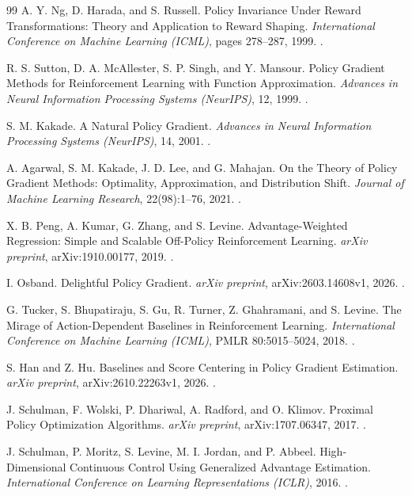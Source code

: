 \begin{thebibliography}{99}
A. Y. Ng, D. Harada, and S. Russell.
\newblock Policy Invariance Under Reward Transformations: Theory and Application to Reward Shaping.
\newblock \emph{International Conference on Machine Learning (ICML)}, pages 278--287, 1999.
\newblock {}.

R. S. Sutton, D. A. McAllester, S. P. Singh, and Y. Mansour.
\newblock Policy Gradient Methods for Reinforcement Learning with Function Approximation.
\newblock \emph{Advances in Neural Information Processing Systems (NeurIPS)}, 12, 1999.
\newblock {}.

S. M. Kakade.
\newblock A Natural Policy Gradient.
\newblock \emph{Advances in Neural Information Processing Systems (NeurIPS)}, 14, 2001.
\newblock {}.

A. Agarwal, S. M. Kakade, J. D. Lee, and G. Mahajan.
\newblock On the Theory of Policy Gradient Methods: Optimality, Approximation, and Distribution Shift.
\newblock \emph{Journal of Machine Learning Research}, 22(98):1--76, 2021.
\newblock {}.

X. B. Peng, A. Kumar, G. Zhang, and S. Levine.
\newblock Advantage-Weighted Regression: Simple and Scalable Off-Policy Reinforcement Learning.
\newblock \emph{arXiv preprint}, arXiv:1910.00177, 2019.
\newblock {}.

I. Osband.
\newblock Delightful Policy Gradient.
\newblock \emph{arXiv preprint}, arXiv:2603.14608v1, 2026.
\newblock {}.

G. Tucker, S. Bhupatiraju, S. Gu, R. Turner, Z. Ghahramani, and S. Levine.
\newblock The Mirage of Action-Dependent Baselines in Reinforcement Learning.
\newblock \emph{International Conference on Machine Learning (ICML)}, PMLR 80:5015--5024, 2018.
\newblock {}.

S. Han and Z. Hu.
\newblock Baselines and Score Centering in Policy Gradient Estimation.
\newblock \emph{arXiv preprint}, arXiv:2610.22263v1, 2026.
\newblock {}.

J. Schulman, F. Wolski, P. Dhariwal, A. Radford, and O. Klimov.
\newblock Proximal Policy Optimization Algorithms.
\newblock \emph{arXiv preprint}, arXiv:1707.06347, 2017.
\newblock {}.

J. Schulman, P. Moritz, S. Levine, M. I. Jordan, and P. Abbeel.
\newblock High-Dimensional Continuous Control Using Generalized Advantage Estimation.
\newblock \emph{International Conference on Learning Representations (ICLR)}, 2016.
\newblock {}.

\end{thebibliography}
